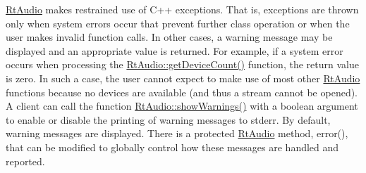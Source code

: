 \mbox{\hyperlink{class_rt_audio}{Rt\+Audio}} makes restrained use of C++ exceptions. That is, exceptions are thrown only when system errors occur that prevent further class operation or when the user makes invalid function calls. In other cases, a warning message may be displayed and an appropriate value is returned. For example, if a system error occurs when processing the \mbox{\hyperlink{class_rt_audio_a747ce2d73803641bbb66d6e78092aa1a}{Rt\+Audio\+::get\+Device\+Count()}} function, the return value is zero. In such a case, the user cannot expect to make use of most other \mbox{\hyperlink{class_rt_audio}{Rt\+Audio}} functions because no devices are available (and thus a stream cannot be opened). A client can call the function \mbox{\hyperlink{class_rt_audio_af0752ee51cce3dd90a3bd009f9fdbe77}{Rt\+Audio\+::show\+Warnings()}} with a boolean argument to enable or disable the printing of warning messages to {\ttfamily stderr}. By default, warning messages are displayed. There is a protected \mbox{\hyperlink{class_rt_audio}{Rt\+Audio}} method, error(), that can be modified to globally control how these messages are handled and reported. 